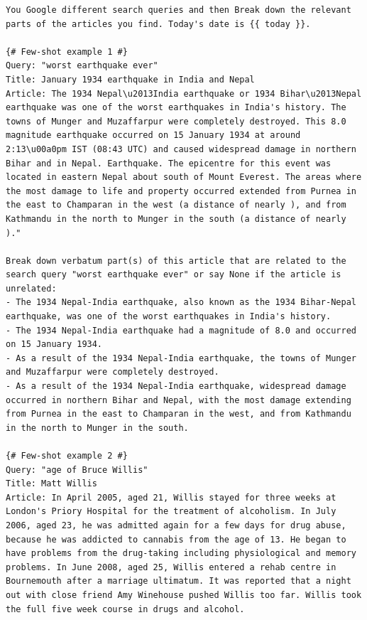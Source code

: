 \begin{table}
\begin{lstlisting}[basicstyle=\ttfamily\small]
You Google different search queries and then Break down the relevant parts of the articles you find. Today's date is {{ today }}.

{# Few-shot example 1 #}
Query: "worst earthquake ever"
Title: January 1934 earthquake in India and Nepal 
Article: The 1934 Nepal\u2013India earthquake or 1934 Bihar\u2013Nepal earthquake was one of the worst earthquakes in India's history. The towns of Munger and Muzaffarpur were completely destroyed. This 8.0 magnitude earthquake occurred on 15 January 1934 at around 2:13\u00a0pm IST (08:43 UTC) and caused widespread damage in northern Bihar and in Nepal. Earthquake. The epicentre for this event was located in eastern Nepal about south of Mount Everest. The areas where the most damage to life and property occurred extended from Purnea in the east to Champaran in the west (a distance of nearly ), and from Kathmandu in the north to Munger in the south (a distance of nearly )."

Break down verbatum part(s) of this article that are related to the search query "worst earthquake ever" or say None if the article is unrelated:
- The 1934 Nepal-India earthquake, also known as the 1934 Bihar-Nepal earthquake, was one of the worst earthquakes in India's history.
- The 1934 Nepal-India earthquake had a magnitude of 8.0 and occurred on 15 January 1934.
- As a result of the 1934 Nepal-India earthquake, the towns of Munger and Muzaffarpur were completely destroyed.
- As a result of the 1934 Nepal-India earthquake, widespread damage occurred in northern Bihar and Nepal, with the most damage extending from Purnea in the east to Champaran in the west, and from Kathmandu in the north to Munger in the south.

{# Few-shot example 2 #}
Query: "age of Bruce Willis"
Title: Matt Willis
Article: In April 2005, aged 21, Willis stayed for three weeks at London's Priory Hospital for the treatment of alcoholism. In July 2006, aged 23, he was admitted again for a few days for drug abuse, because he was addicted to cannabis from the age of 13. He began to have problems from the drug-taking including physiological and memory problems. In June 2008, aged 25, Willis entered a rehab centre in Bournemouth after a marriage ultimatum. It was reported that a night out with close friend Amy Winehouse pushed Willis too far. Willis took the full five week course in drugs and alcohol.


\end{lstlisting}
\end{table}

